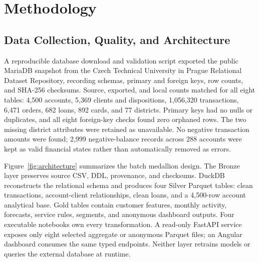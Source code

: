 \documentclass[conference]{IEEEtran}
\begin{document}
\section{Methodology}

\subsection{Data Collection, Quality, and Architecture}

A reproducible database download and validation script exported the public MariaDB snapshot from the Czech Technical University in Prague Relational Dataset Repository, recording schemas, primary and foreign keys, row counts, and SHA-256 checksums. Source, exported, and local counts matched for all eight tables: 4,500 accounts, 5,369 clients and dispositions, 1,056,320 transactions, 6,471 orders, 682 loans, 892 cards, and 77 districts. Primary keys had no nulls or duplicates, and all eight foreign-key checks found zero orphaned rows. The two missing district attributes were retained as unavailable. No negative transaction amounts were found; 2,999 negative-balance records across 288 accounts were kept as valid financial states rather than automatically removed as errors.

Figure~\ref{fig:architecture} summarizes the batch medallion design. The Bronze layer preserves source CSV, DDL, provenance, and checksums. DuckDB \cite{raasveldt2019} reconstructs the relational schema and produces four Silver Parquet tables: clean transactions, account-client relationships, clean loans, and a 4,500-row account analytical base. Gold tables contain customer features, monthly activity, forecasts, service rules, segments, and anonymous dashboard outputs. Four executable notebooks own every transformation. A read-only FastAPI service exposes only eight selected aggregate or anonymous Parquet files; an Angular dashboard consumes the same typed endpoints. Neither layer retrains models or queries the external database at runtime.
\end{document}
